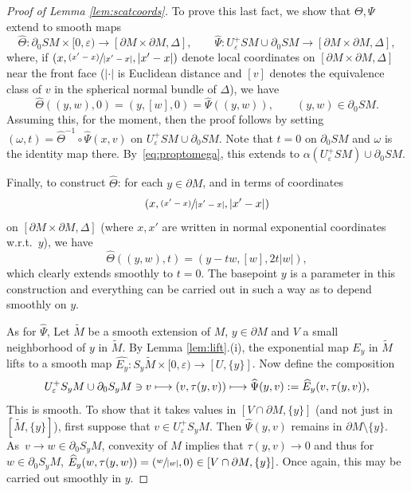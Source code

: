 \documentclass[JEP,XML,SOM,Unicode,NoFloatCountersInSection, NoEqCountersInSection,published]{cedram}
\let\epsilon\varepsilon
\let\backslash\setminus
\newcommand{\psfrac}[2]{\sfrac{(#1)}{#2}}
\def\mto{\mathchoice{\longmapsto}{\mapsto}{\mapsto}{\mapsto}}
\theoremstyle{plain}
\theoremstyle{definition}
\theoremstyle{remark}
\newcommand{\del}{\partial}
\begin{document}
\begin{proof}[Proof of Lemma \ref{lem:scatcoords}]
To prove this last fact, we show that $\Theta,\Psi$ extend to smooth maps
\begin{equation*}
\widehat{\Theta} \colon \partial_0 SM \times [0,\varepsilon) \to [\partial M\times \partial M,\Delta], \qquad
\widehat{\Psi} \colon U_\varepsilon^+ SM \cup \partial_0 SM \to [\partial M\times \partial M,\Delta],
\end{equation*}
where, if $(x,\psfrac{x'-x}{|x'-x|},|x'-x|)$ denote local coordinates on $[\partial M\times \partial M,\Delta]$ near the front face
($|\cdot|$ is Euclidean distance and $[v]$ denotes the equivalence class of $v$ in the spherical normal bundle of $\Delta$), we have
\begin{equation*}
\widehat{\Theta}((y,w),0) = (y,[w],0) = \widehat{\Psi} ((y,w)), \qquad (y,w)\in \partial_0 SM.
\end{equation*}
Assuming this, for the moment, then the proof follows by setting $(\omega,t) = \widehat{\Theta}^{-1}\circ \widehat{\Psi} (x,v)$ on
$U_\varepsilon^+ SM \cup \del_0 SM$. Note that $t=0$ on $\partial_0 SM$ and $\omega$ is the identity map there. By~\eqref{eq:proptomega},
this extends to $\alpha(U_\epsilon^+ SM) \cup \del_0 SM$.

Finally, to construct $\widehat{\Theta}$: for each $y\in \partial M$, and in terms of coordinates
\begin{equation*}
(x,\psfrac{x'-x}{|x'-x|},|x'-x|)
\end{equation*}
on $[\partial M\times \partial M, \Delta]$ (where $x,x'$ are written in normal exponential coordinates w.r.t.~$y$), we have
\begin{equation*}
\widehat{\Theta}((y,w),t) = (y-tw, [w], 2t |w|),
\end{equation*}
which clearly extends smoothly to $t=0$. The basepoint $y$ is a parameter in this construction and everything can be carried out in such a way as to depend smoothly on $y$.

As for $\widehat{\Psi}$, Let $\widetilde{M}$ be a smooth extension of $M$, $y\in \partial M$ and $V$ a small neighborhood of $y$ in
$\widetilde{M}$. By Lemma \ref{lem:lift}.(i), the exponential map $E_y$ in $\widetilde{M}$ lifts to a smooth map $\widehat{E_y} \colon S_y \widetilde{M}\times [0,\varepsilon) \to [U,\{y\}]$. Now define the composition
\begin{equation*}
U_\varepsilon^+ S_y M \cup \partial_0 S_y M \ni v \mto (v, \tau(y,v)) \mto \widehat{\Psi}(y,v) := \widehat{E}_y (v, \tau(y,v)),
\end{equation*}
This is smooth. To show that it takes values in $[V\cap \partial M, \{y\}]$ (and not just in $[\widetilde M, \{y\}]$),
first suppose that $v\in U_\varepsilon^+ S_y M$. Then $\widehat{\Psi}(y,v)$ remains in $\partial M\backslash \{y\}$.
As~$v\to w \in \partial_0 S_y M$, convexity of $M$ implies that $\tau(y,v) \to 0$ and thus for $w\in \partial_0 S_y M$,
$\widehat{E}_y (w, \tau(y,w)) = (\sfrac{w}{|w|},0) \in [V\cap \partial M, \{y\}]$. Once again, this may be carried out
smoothly in $y$.
\end{proof}
\end{document}
